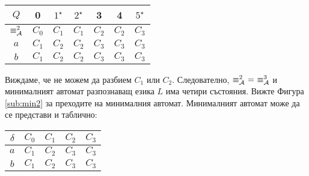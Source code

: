 {\begin{hint}
\begin{itemize}
      \begin{tabular}{|c|c|c|c|c|c|c|}
        \hline
        $Q$ & 0 & $1^\star$ & $2^\star$ & 3 & 4 & $5^\star$ \\
        \hline
        \hline
        $\equiv^2_{\mathcal{A}}$ & $C_0$ & $C_1$ & $C_1$ & $C_2$ & $C_2$ & $C_3$\\
        \hline
        $a$ & $C_1$ & $C_2$ & $C_2$ & $C_3$ & $C_3$ & $C_3$\\
        \hline
        $b$ & $C_1$ & $C_2$ & $C_2$ & $C_3$ & $C_3$ & $C_3$\\
        \hline
      \end{tabular}
      
      Виждаме, че не можем да разбием $C_1$ или $C_2$.
      Следователно, $\equiv^2_\A\ =\ \equiv^3_\A$ и минималният автомат разпознаващ езика $L$
      има четири състояния. Вижте Фигура \ref{sub:min2} за преходите на минималния автомат.
      Минималният автомат може да се представи и таблично:

      \begin{tabular}{|c|c|c|c|c|}
        \hline
        $\delta$ & $C_0$ & $C_1$ & $C_2$ & $C_3$ \\
        \hline
        $a$ & $C_1$ & $C_2$ & $C_3$ & $C_3$ \\
        \hline
        $b$ & $C_1$ & $C_2$ & $C_3$ & $C_3$ \\
        \hline
      \end{tabular}
      
  \end{itemize}
\end{hint}
}

